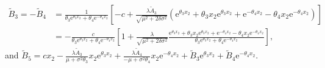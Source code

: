 \documentclass[11pt,reqno]{article}%
\numberwithin{equation}{section}
\begin{document}
\begin{equation}\nonumber
\begin{aligned}
 \tilde{B}_{3} =- \tilde{B}_{4}&=\frac{1}{\theta_{3} \mathrm{e}^{\theta_{3}x_2}+\theta_{4}\mathrm{e}^{-\theta_{4}x_2}}\left[-c+\frac{\lambda \tilde{A}_3}{\sqrt{\mu^2 + 2 \delta \sigma^2}}\left(\mathrm{e}^{\theta_{3}x_2}+\theta_{3}x_2\mathrm{e}^{\theta_{3}x_2}+\mathrm{e}^{-\theta_{4}x_2}-\theta_{4}x_2\mathrm{e}^{-\theta_{4}x_2}\right)\right]\\
 &=-\frac{c}{\theta_{3} \mathrm{e}^{\theta_{3}x_2}+\theta_{4}\mathrm{e}^{-\theta_{4}x_2}}\left[1+\frac{\lambda }{\sqrt{\mu^2 + 2 \delta \sigma^2}}\frac{\mathrm{e}^{\theta_{3}x_2}+\theta_{3}x_2\mathrm{e}^{\theta_{3}x_2}+\mathrm{e}^{-\theta_{4}x_2}-\theta_{4}x_2\mathrm{e}^{-\theta_{4}x_2}}{\theta_{3} \mathrm{e}^{\theta_{3}x_2}+\theta_{4}\mathrm{e}^{-\theta_{4}x_2}}\right],\end{aligned}
\end{equation}
and $\tilde{B}_{5}=cx_2-\frac{\lambda \tilde{A}_3}{\mu+\sigma^2\theta_3}x_2\mathrm{e}^{\theta_{3}x_2}+\frac{\lambda \tilde{A}_4}{-\mu+\sigma^2\theta_4}x_2\mathrm{e}^{-\theta_{4}x_2}+\tilde{B}_{3} \mathrm{e}^{\theta_{3} x_2} + \tilde{B}_{4} \mathrm{e}^{-\theta_{4}x_2}$.
\end{document}
